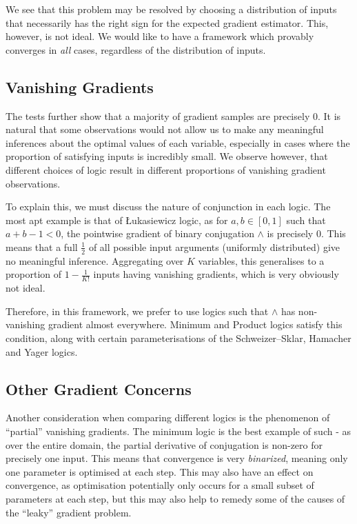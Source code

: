 We see that this problem may be resolved by choosing a distribution of inputs that necessarily has the right sign for the expected gradient estimator. This, however, is not ideal. We would like to have a framework which provably converges in \textit{all} cases, regardless of the distribution of inputs. 

\subsection{Vanishing Gradients}

The tests further show that a majority of gradient samples are precisely $0$. It is natural that some observations would not allow us to make any meaningful inferences about the optimal values of each variable, especially in cases where the proportion of satisfying inputs is incredibly small. We observe however, that different choices of logic result in different proportions of vanishing gradient observations.

To explain this, we must discuss the nature of conjunction in each logic. The most apt example is that of Łukasiewicz logic, as for $a, b \in [0,1]$ such that $a + b - 1 < 0$, the pointwise gradient of binary conjugation $\land$ is precisely $0$. This means that a full $\frac{1}{2}$ of all possible input arguments (uniformly distributed) give no meaningful inference. Aggregating over $K$ variables, this generalises to a proportion of $1 - \frac{1}{K!}$ inputs having vanishing gradients, which is very obviously not ideal.

Therefore, in this framework, we prefer to use logics such that $\land$ has non-vanishing gradient almost everywhere. Minimum and Product logics satisfy this condition, along with certain parameterisations of the Schweizer–Sklar, Hamacher and Yager logics.

\subsection{Other Gradient Concerns}

Another consideration when comparing different logics is the phenomenon of ``partial'' vanishing gradients. The minimum logic is the best example of such - as over the entire domain, the partial derivative of conjugation is non-zero for precisely one input. This means that convergence is very \textit{binarized}, meaning only one parameter is optimised at each step. This may also have an effect on convergence, as optimisation potentially only occurs for a small subset of parameters at each step, but this may also help to remedy some of the causes of the ``leaky'' gradient problem.

